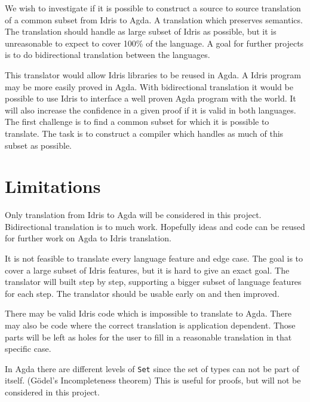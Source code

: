 \documentclass[parskip=half]{scrartcl}
\begin{document}
We wish to investigate if it is possible to construct a source to source
translation of a common subset from Idris to Agda. A translation which
preserves semantics. The translation should handle as large subset of Idris as
possible, but it is unreasonable to expect to cover 100\% of the language.
A goal for further projects is to do bidirectional translation between the
languages.

This translator would allow Idris libraries to be reused in Agda. A Idris
program may be more easily proved in Agda. %
With bidirectional translation it
would be possible to use Idris to interface a well proven Agda program with the
world.  It will also increase the confidence in a given proof if it is valid in
both languages.  The first challenge is to find a common subset for which it is
possible to translate. The task is to construct a compiler which handles as
much of this subset as possible.


\section{Limitations}
Only translation from Idris to Agda will be considered in this project.
Bidirectional translation is to much work. Hopefully ideas and code can be
reused for further work on Agda to Idris translation.

It is not feasible to translate every language feature and edge case.  The goal
is to cover a large subset of Idris features, but it is hard to give an exact
goal.  The translator will built step by step, supporting a bigger subset of
language features for each step. The translator should be usable early on and
then improved.

There may be valid Idris code which is impossible to translate to Agda. There
may also be code where the correct translation is application dependent. Those
parts will be left as holes for the user to fill in a reasonable translation in
that specific case.


In Agda there are different levels of \texttt{Set} since the set of types can not be
part of itself. (Gödel's Incompleteness theorem) This is useful for proofs, but
will not be considered in this project.
\end{document}
